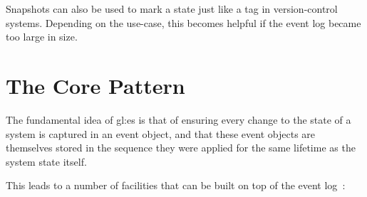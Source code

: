 Snapshots can also be used to mark a state just like a tag in version-control systems. Depending on the use-case, this becomes helpful if the event log became too large in size.





\section{The Core Pattern}

The fundamental idea of \gls{gl:es} is that of ensuring every change to the state of a system is captured in an event object, and that these event objects are themselves stored in the sequence they were applied for the same lifetime as the system state itself.


This leads to a number of facilities that can be built on top of the event log~\citep{fowleres}:

